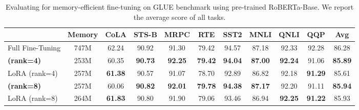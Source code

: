 \begin{table*}[t]
    \caption{\small{Evaluating \lowrank{} for memory-efficient fine-tuning on GLUE benchmark using pre-trained RoBERTa-Base. We report the average score of all tasks.}}
    \label{tab:fine_tuning}
    \centering
    \begin{tabular}{l|c|cccccccc|c} %
    \toprule
               & \textbf{Memory} & \textbf{CoLA} & \textbf{STS-B} & \textbf{MRPC} & \textbf{RTE} & \textbf{SST2} & \textbf{MNLI} & \textbf{QNLI} & \textbf{QQP} & \textbf{Avg} \\
    \midrule
    Full Fine-Tuning & 747M & 62.24 & 90.92 & 91.30 & 79.42 & 94.57 & 87.18 & 92.33 & 92.28 & 86.28 \\
    \midrule
    \textbf{\lowrank{} (rank=4)} & 253M & 60.35 & \textbf{90.73} & \textbf{92.25} & \textbf{79.42} & \textbf{94.04} & \textbf{87.00} & \textbf{92.24} & 91.06 & \textbf{85.89} \\
    LoRA (rank=4) & 257M & \textbf{61.38} & 90.57 & 91.07 & 78.70  & 92.89 & 86.82 & 92.18 & \textbf{91.29} & 85.61 \\
    \midrule
    \textbf{\lowrank{} (rank=8)} & 257M & 60.06 & \textbf{90.82} & \textbf{92.01} & \textbf{79.78} & \textbf{94.38} & \textbf{87.17} & 92.20 & 91.11 & \textbf{85.94} \\
    LoRA (rank=8) & 264M & \textbf{61.83} & 90.80 & 91.90 & 79.06  & 93.46 & 86.94 & \textbf{92.25} & \textbf{91.22} & 85.93 \\
    \bottomrule
    \end{tabular}
    \vskip -0.1in
\end{table*}



